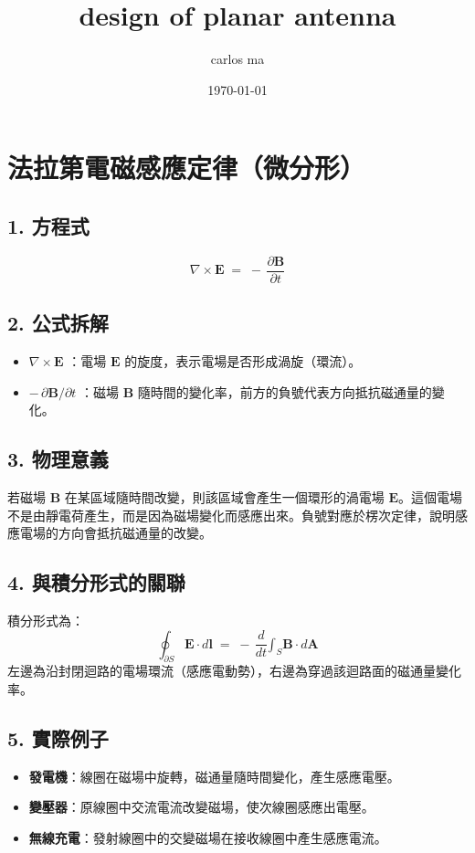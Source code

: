 \documentclass{article}
\title{design of planar antenna}
\author{carlos ma}
\date{\today}
\def\dfrac#1#2{#1/#2}%
\def\int{\text{∫}}%
\begin{document}
\maketitle
\section*{法拉第電磁感應定律（微分形）}

\subsection*{1. 方程式}
\begin{equation}
\nabla \times \mathbf{E} \;=\; -\,\frac{\partial \mathbf{B}}{\partial t}
\end{equation}

\subsection*{2. 公式拆解}
\begin{itemize}
  \item $\nabla \times \mathbf{E}$ ：電場 $\mathbf{E}$ 的旋度，表示電場是否形成渦旋（環流）。
  \item $-\,\dfrac{\partial \mathbf{B}}{\partial t}$ ：磁場 $\mathbf{B}$ 隨時間的變化率，前方的負號代表方向抵抗磁通量的變化。
\end{itemize}

\subsection*{3. 物理意義}
若磁場 $\mathbf{B}$ 在某區域隨時間改變，則該區域會產生一個環形的渦電場 $\mathbf{E}$。這個電場不是由靜電荷產生，而是因為磁場變化而感應出來。負號對應於楞次定律，說明感應電場的方向會抵抗磁通量的改變。

\subsection*{4. 與積分形式的關聯}
積分形式為：
\begin{equation}
\oint_{\partial S} \mathbf{E}\cdot d\mathbf{l}
\;=\; -\,\frac{d}{dt}\int_{S}\mathbf{B}\cdot d\mathbf{A}
\end{equation}
左邊為沿封閉迴路的電場環流（感應電動勢），右邊為穿過該迴路面的磁通量變化率。

\subsection*{5. 實際例子}
\begin{itemize}
  \item \textbf{發電機}：線圈在磁場中旋轉，磁通量隨時間變化，產生感應電壓。
  \item \textbf{變壓器}：原線圈中交流電流改變磁場，使次線圈感應出電壓。
  \item \textbf{無線充電}：發射線圈中的交變磁場在接收線圈中產生感應電流。
\end{itemize}
\end{document}
